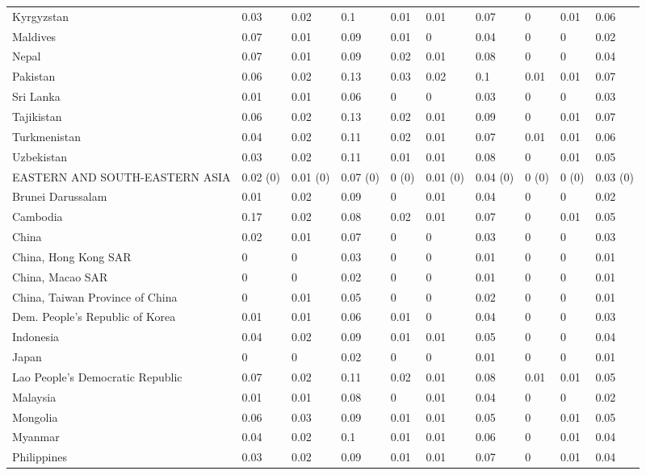 \begin{longtable}[t]{llllllllll}
Kyrgyzstan & 0.03 & 0.02 & 0.1 & 0.01 & 0.01 & 0.07 & 0 & 0.01 & 0.06\\
Maldives & 0.07 & 0.01 & 0.09 & 0.01 & 0 & 0.04 & 0 & 0 & 0.02\\
Nepal & 0.07 & 0.01 & 0.09 & 0.02 & 0.01 & 0.08 & 0 & 0 & 0.04\\
Pakistan & 0.06 & 0.02 & 0.13 & 0.03 & 0.02 & 0.1 & 0.01 & 0.01 & 0.07\\
Sri Lanka & 0.01 & 0.01 & 0.06 & 0 & 0 & 0.03 & 0 & 0 & 0.03\\
Tajikistan & 0.06 & 0.02 & 0.13 & 0.02 & 0.01 & 0.09 & 0 & 0.01 & 0.07\\
Turkmenistan & 0.04 & 0.02 & 0.11 & 0.02 & 0.01 & 0.07 & 0.01 & 0.01 & 0.06\\
Uzbekistan & 0.03 & 0.02 & 0.11 & 0.01 & 0.01 & 0.08 & 0 & 0.01 & 0.05\\
EASTERN AND SOUTH-EASTERN ASIA & 0.02 (0) & 0.01 (0) & 0.07 (0) & 0 (0) & 0.01 (0) & 0.04 (0) & 0 (0) & 0 (0) & 0.03 (0)\\
Brunei Darussalam & 0.01 & 0.02 & 0.09 & 0 & 0.01 & 0.04 & 0 & 0 & 0.02\\
Cambodia & 0.17 & 0.02 & 0.08 & 0.02 & 0.01 & 0.07 & 0 & 0.01 & 0.05\\
China & 0.02 & 0.01 & 0.07 & 0 & 0 & 0.03 & 0 & 0 & 0.03\\
China, Hong Kong SAR & 0 & 0 & 0.03 & 0 & 0 & 0.01 & 0 & 0 & 0.01\\
China, Macao SAR & 0 & 0 & 0.02 & 0 & 0 & 0.01 & 0 & 0 & 0.01\\
China, Taiwan Province of China & 0 & 0.01 & 0.05 & 0 & 0 & 0.02 & 0 & 0 & 0.01\\
Dem. People's Republic of Korea & 0.01 & 0.01 & 0.06 & 0.01 & 0 & 0.04 & 0 & 0 & 0.03\\
Indonesia & 0.04 & 0.02 & 0.09 & 0.01 & 0.01 & 0.05 & 0 & 0 & 0.04\\
Japan & 0 & 0 & 0.02 & 0 & 0 & 0.01 & 0 & 0 & 0.01\\
Lao People's Democratic Republic & 0.07 & 0.02 & 0.11 & 0.02 & 0.01 & 0.08 & 0.01 & 0.01 & 0.05\\
Malaysia & 0.01 & 0.01 & 0.08 & 0 & 0.01 & 0.04 & 0 & 0 & 0.02\\
Mongolia & 0.06 & 0.03 & 0.09 & 0.01 & 0.01 & 0.05 & 0 & 0.01 & 0.05\\
Myanmar & 0.04 & 0.02 & 0.1 & 0.01 & 0.01 & 0.06 & 0 & 0.01 & 0.04\\
Philippines & 0.03 & 0.02 & 0.09 & 0.01 & 0.01 & 0.07 & 0 & 0.01 & 0.04\\

\end{longtable}
